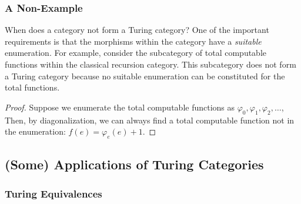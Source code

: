 
\subsubsection{A Non-Example}

  When does a category not form a Turing category?
  One of the important requirements is that the morphisms
  within the category have a \emph{suitable} enumeration.
  For example, consider the subcategory of total computable functions
  within the classical recursion category.
  This subcategory does not form a Turing category because no suitable
  enumeration can be constituted for the total functions.

  \begin{proof}
    Suppose we enumerate the total computable functions as
    $\varphi_0, \varphi_1, \varphi_2, \ldots$,
    Then, by diagonalization, we can always find a total computable function
    not in the enumeration: $f(e) = \varphi_e(e) + 1$.
  \end{proof}

\subsection{(Some) Applications of Turing Categories}

\subsubsection{Turing Equivalences}

